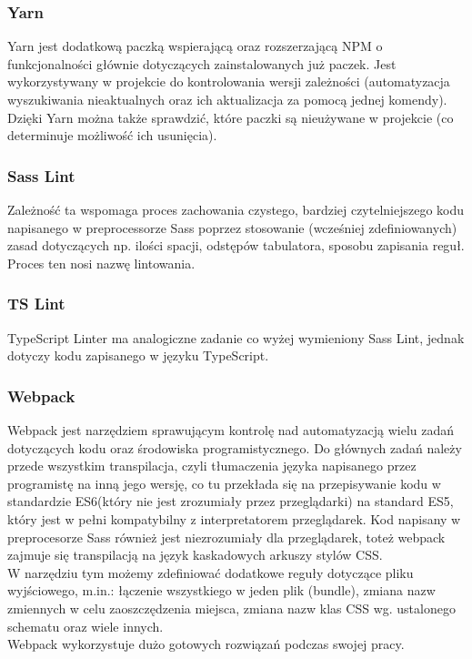 \documentclass[eng,printmode]{mgr}
\begin{document}
\subsubsection{Yarn}
Yarn\cite{Yarn} jest dodatkową paczką wspierającą oraz rozszerzającą NPM o funkcjonalności głównie dotyczących  zainstalowanych już paczek. Jest wykorzystywany w projekcie do kontrolowania wersji zależności (automatyzacja wyszukiwania nieaktualnych oraz ich aktualizacja za pomocą jednej komendy). Dzięki Yarn można także sprawdzić, które paczki są nieużywane w projekcie (co determinuje możliwość ich usunięcia).

\subsubsection{Sass Lint}
Zależność ta\cite{SassLint} wspomaga proces zachowania czystego, bardziej czytelniejszego kodu napisanego w preprocessorze  Sass poprzez stosowanie (wcześniej zdefiniowanych) zasad dotyczących np. ilości spacji, odstępów tabulatora, sposobu zapisania reguł. Proces ten nosi nazwę lintowania.

\subsubsection{TS Lint}
TypeScript Linter\cite{TSLint} ma analogiczne zadanie co wyżej wymieniony Sass Lint, jednak dotyczy kodu zapisanego w języku TypeScript.

\subsubsection{Webpack}
Webpack\cite{Webpack} jest narzędziem sprawującym kontrolę nad automatyzacją wielu zadań dotyczących kodu oraz środowiska programistycznego. Do głównych zadań należy przede wszystkim transpilacja\cite{Keyword_Transpile}, czyli tłumaczenia języka napisanego przez programistę na inną jego wersję, co tu przekłada się na przepisywanie kodu w standardzie ES6(który nie jest zrozumiały przez przeglądarki) na standard ES5, który jest w pełni kompatybilny z interpretatorem przeglądarek. Kod napisany w preprocesorze Sass również jest niezrozumiały dla przeglądarek, toteż webpack zajmuje się transpilacją na język kaskadowych arkuszy stylów CSS.
\\
W narzędziu tym możemy zdefiniować dodatkowe reguły dotyczące pliku wyjściowego, m.in.: łączenie wszystkiego w jeden plik (bundle), zmiana nazw zmiennych w celu zaoszczędzenia miejsca, zmiana nazw klas CSS wg. ustalonego schematu oraz wiele innych. 
\\
Webpack wykorzystuje dużo gotowych rozwiązań podczas swojej pracy.
\end{document}
